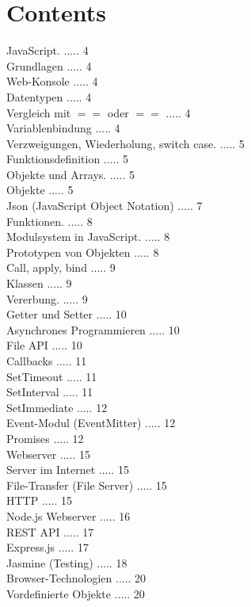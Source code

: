 \documentclass[10pt]{article}
\begin{document}
\section*{Contents}
JavaScript. ..... 4\\
Grundlagen ..... 4\\
Web-Konsole ..... 4\\
Datentypen ..... 4\\
Vergleich mit $==$ oder $==$ ..... 4\\
Variablenbindung ..... 4\\
Verzweigungen, Wiederholung, switch case. ..... 5\\
Funktionsdefinition ..... 5\\
Objekte und Arrays. ..... 5\\
Objekte ..... 5\\
Json (JavaScript Object Notation) ..... 7\\
Funktionen. .....  8\\
Modulsystem in JavaScript. .....  8\\
Prototypen von Objekten .....  8\\
Call, apply, bind .....  9\\
Klassen ..... 9\\
Vererbung. .....  9\\
Getter und Setter ..... 10\\
Asynchrones Programmieren ..... 10\\
File API ..... 10\\
Callbacks ..... 11\\
SetTimeout ..... 11\\
SetInterval ..... 11\\
SetImmediate ..... 12\\
Event-Modul (EventMitter) ..... 12\\
Promises ..... 12\\
Webserver ..... 15\\
Server im Internet ..... 15\\
File-Transfer (File Server) ..... 15\\
HTTP ..... 15\\
Node.js Webserver ..... 16\\
REST API ..... 17\\
Express.js ..... 17\\
Jasmine (Testing) ..... 18\\
Browser-Technologien ..... 20\\
Vordefinierte Objekte ..... 20\\
\end{document}
